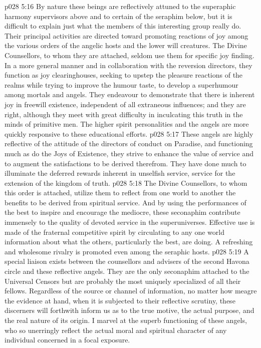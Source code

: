 \vs p028 5:16 \bibnobreakspace {} By nature these beings are reflectively attuned to the superaphic harmony supervisors above and to certain of the seraphim below, but it is difficult to explain just what the members of this interesting group really do. Their principal activities are directed toward promoting reactions of joy among the various orders of the angelic hosts and the lower will creatures. The Divine Counsellors, to whom they are attached, seldom use them for specific joy finding. In a more general manner and in collaboration with the reversion directors, they function as joy clearinghouses, seeking to upstep the pleasure reactions of the realms while trying to improve the humour taste, to develop a superhumour among mortals and angels. They endeavour to demonstrate that there is inherent joy in freewill existence, independent of all extraneous influences; and they are right, although they meet with great difficulty in inculcating this truth in the minds of primitive men. The higher spirit personalities and the angels are more quickly responsive to these educational efforts.
\vs p028 5:17 \bibnobreakspace {} These angels are highly reflective of the attitude of the directors of conduct on Paradise, and functioning much as do the Joys of Existence, they strive to enhance the value of service and to augment the satisfactions to be derived therefrom. They have done much to illuminate the deferred rewards inherent in unselfish service, service for the extension of the kingdom of truth.
\vs p028 5:18 The Divine Counsellors, to whom this order is attached, utilize them to reflect from one world to another the benefits to be derived from spiritual service. And by using the performances of the best to inspire and encourage the mediocre, these seconaphim contribute immensely to the quality of devoted service in the superuniverses. Effective use is made of the fraternal competitive spirit by circulating to any one world information about what the others, particularly the best, are doing. A refreshing and wholesome rivalry is promoted even among the seraphic hosts.
\vs p028 5:19 \bibnobreakspace {} A special liaison exists between the counsellors and advisers of the second Havona circle and these reflective angels. They are the only seconaphim attached to the Universal Censors but are probably the most uniquely specialized of all their fellows. Regardless of the source or channel of information, no matter how meagre the evidence at hand, when it is subjected to their reflective scrutiny, these discerners will forthwith inform us as to the true motive, the actual purpose, and the real nature of its origin. I marvel at the superb functioning of these angels, who so unerringly reflect the actual moral and spiritual character of any individual concerned in a focal exposure.
